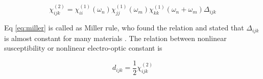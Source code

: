 \documentclass[thesis]{deutez}
\begin{document}
    \begin{equation}
        \chi^{(2)}_{ijk} = \chi^{(1)}_{ii} (\omega_n) \chi^{(1)}_{jj} (\omega_m) \chi^{(1)}_{kk} (\omega_n+\omega_m) \Delta_{ijk}
        \label{eq:miller}
    \end{equation}

    Eq \ref{eq:miller} is called as Miller rule, who found the relation and stated that $\Delta_{ijk}$ is almost constant for many materials \cite{11}. The relation between nonlinear susceptibility or nonlinear electro-optic constant is 

    \begin{equation}
        d_{ijk} = \frac{1}{2}\chi^{(2)}_{ijk}
        \label{eq:sus-const}
    \end{equation}


    

\end{document}
